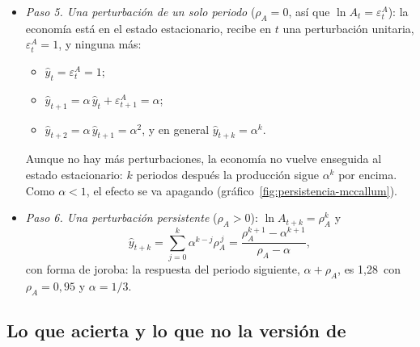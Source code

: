 \documentclass[11pt]{article}
\begin{document}
\begin{itemize}
\begin{itemize}
\begin{equation*}
  \end{equation*}
  \end{itemize}
  Es un resultado fundamental: en un modelo muy sencillo, las decisiones óptimas de los agentes bastan para que las perturbaciones duren.
\item \emph{Paso 5. Una perturbación de un solo periodo} ($\rho_A=0$, así que $\ln A_t=\varepsilon^A_t$): la economía está en el estado estacionario, recibe en $t$ una perturbación unitaria, $\varepsilon^A_t=1$, y ninguna más:
  \begin{itemize}
  \item $\hat y_t=\varepsilon^A_t=1$;
  \item $\hat y_{t+1}=\alpha\,\hat y_t+\varepsilon^A_{t+1}=\alpha$;
  \item $\hat y_{t+2}=\alpha\,\hat y_{t+1}=\alpha^2$, y en general $\hat y_{t+k}=\alpha^k$.
  \end{itemize}
  Aunque no hay más perturbaciones, la economía no vuelve enseguida al estado estacionario: $k$ periodos después la producción sigue $\alpha^k$ por encima. Como $\alpha<1$, el efecto se va apagando (gráfico~\ref{fig:persistencia-mccallum}).
\item \emph{Paso 6. Una perturbación persistente} ($\rho_A>0$): $\ln A_{t+k}=\rho_A^k$ y
  \begin{equation*}
  \hat y_{t+k}=\sum_{j=0}^{k}\alpha^{k-j}\rho_A^{\,j}=\frac{\rho_A^{k+1}-\alpha^{k+1}}{\rho_A-\alpha},
  \end{equation*}
  con forma de joroba: la respuesta del periodo siguiente, $\alpha+\rho_A$, es 1,28~con $\rho_A=0{,}95$ y $\alpha=1/3$.
\end{itemize}

\subsection{Lo que acierta y lo que no la versión de }
\end{document}
